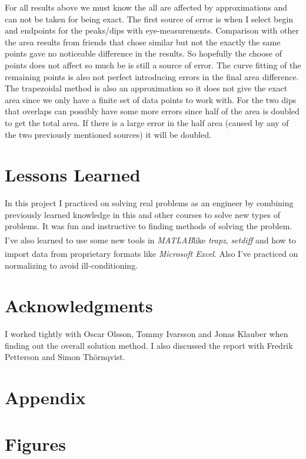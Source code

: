 \documentclass[10pt, a4paper]{article}
\newcommand{\matlab}{\small{\emph{MATLAB\textsuperscript{\textregistered}}}}
\newcommand{\excel}{\emph{Microsoft Excel\textsuperscript{\textregistered}}}
\begin{document}
For all results above we must know the all are affected by approximations and can not be taken for being exact. The first source of error is when I select begin and endpoints for the peaks/dips with eye-measurements. Comparison with other the area results from friends that chose similar but not the exactly the same points gave no noticeable difference in the results. So hopefully the choose of points does not affect so much be is still a source of error. The curve fitting of the remaining points is also not perfect introducing errors in the final area difference. The trapezoidal method is also an approximation so it does not give the exact area since we only have a finite set of data points to work with. For the two dips that overlaps can possibly have some more errors since half of the area is doubled to get the total area. If there is a large error in the half area (caused by any of the two previously mentioned sources) it will be doubled.

\section{Lessons Learned}
In this project I practiced on solving real problems as an engineer by combining previously learned knowledge in this and other courses to solve new types of problems. It was fun and instructive to finding methods of solving the problem. I've also learned to use some new tools in \matlab like \emph{trapz}, \emph{setdiff} and how to import data from proprietary formats like \excel. Also I've practiced on normalizing to avoid ill-conditioning.

\section{Acknowledgments}

I worked tightly with Oscar Olsson, Tommy Ivarsson and Jonas Klauber when finding out the overall solution method. I also discussed the report with Fredrik Petterson and Simon Thörnqvist.

{}


\newpage
\section*{Appendix}
\appendix
\section{Figures} \label{appendix:figures}
\end{document}

